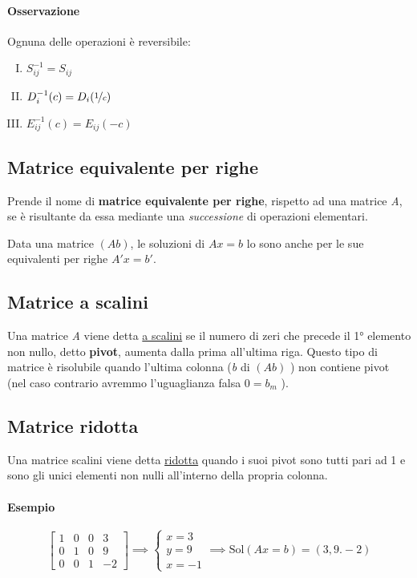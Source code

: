 		\paragraph{Osservazione}
		Ognuna delle operazioni è reversibile:  \newline
		\begin{enumerate}[(I)]
			\item $ S_{ij}^{-1} = S_{ij} $
			\item $ D_{i}^{-1}(c) = D_{i}(\nicefrac{1}{c}) $
			\item $ E_{ij}^{-1}(c) = E_{ij}(-c) $
		\end{enumerate}
		
		\subsection{Matrice equivalente per righe} 
			Prende il nome di \textbf{matrice equivalente per righe}, rispetto ad una matrice \textit{A}, se è risultante da essa mediante una \emph{successione} di operazioni elementari.
			
			Data una matrice $ (Ab) $, le soluzioni di $ Ax = b $ lo sono anche per le sue equivalenti per righe $ A'x = b' $.
			
		\subsection{Matrice a scalini}
			Una matrice \textit{A} viene detta \underline{a scalini} se il numero di zeri che precede il 1° elemento non nullo, detto \textbf{pivot}, aumenta dalla prima all'ultima riga. Questo tipo di matrice è risolubile quando l'ultima colonna (\textit{b} di $(Ab) $ ) non contiene pivot (nel caso contrario avremmo l'uguaglianza falsa $ 0 = b_m $ ).
		
		\subsection{Matrice ridotta}
			Una matrice scalini viene detta \underline{ridotta} quando i suoi pivot sono tutti pari ad 1 e sono gli unici elementi non nulli all'interno della propria colonna.
			\paragraph{Esempio} 
			$$
			\begin{bmatrix}
			1 & 0 & 0 & 3 \\
			0 & 1 & 0 & 9 \\
			0 & 0 & 1 & -2 
			\end{bmatrix} \implies
			\begin{cases}
				x = 3 \\
				y = 9 \\
				x = -1
			\end{cases} \implies \text{Sol}(Ax=b) = {(3, 9. -2)}
			$$
	
